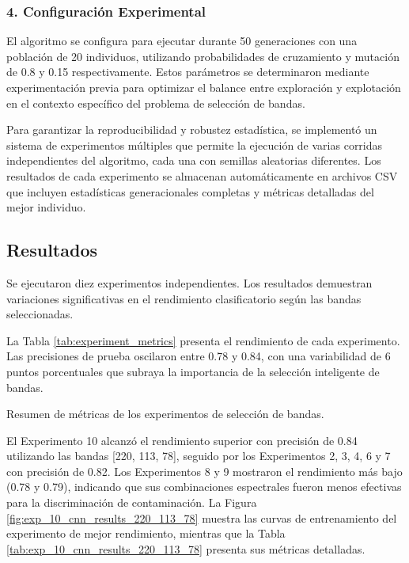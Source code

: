 \subsubsection{4. Configuración Experimental}

El algoritmo se configura para ejecutar durante 50 generaciones con una población de 20 individuos, utilizando probabilidades de cruzamiento y mutación de 0.8 y 0.15 respectivamente. Estos parámetros se determinaron mediante experimentación previa para optimizar el balance entre exploración y explotación en el contexto específico del problema de selección de bandas.

\vspace{5mm}

Para garantizar la reproducibilidad y robustez estadística, se implementó un sistema de experimentos múltiples que permite la ejecución de varias corridas independientes del algoritmo, cada una con semillas aleatorias diferentes. Los resultados de cada experimento se almacenan automáticamente en archivos CSV que incluyen estadísticas generacionales completas y métricas detalladas del mejor individuo.

\subsection{Resultados}

Se ejecutaron diez experimentos independientes. Los resultados demuestran variaciones significativas en el rendimiento clasificatorio según las bandas seleccionadas.

\vspace{5mm}

La Tabla \ref{tab:experiment_metrics} presenta el rendimiento de cada experimento. Las precisiones de prueba oscilaron entre 0.78 y 0.84, con una variabilidad de 6 puntos porcentuales que subraya la importancia de la selección inteligente de bandas.

\begin{table}[ht]
\centering
\caption{Resumen de métricas de los experimentos de selección de bandas.}
\label{tab:experiment_metrics}
\end{table}

El Experimento 10 alcanzó el rendimiento superior con precisión de 0.84 utilizando las bandas [220, 113, 78], seguido por los Experimentos 2, 3, 4, 6 y 7 con precisión de 0.82. Los Experimentos 8 y 9 mostraron el rendimiento más bajo (0.78 y 0.79), indicando que sus combinaciones espectrales fueron menos efectivas para la discriminación de contaminación. La Figura \ref{fig:exp_10_cnn_results_220_113_78} muestra las curvas de entrenamiento del experimento de mejor rendimiento, mientras que la Tabla \ref{tab:exp_10_cnn_results_220_113_78} presenta sus métricas detalladas.

